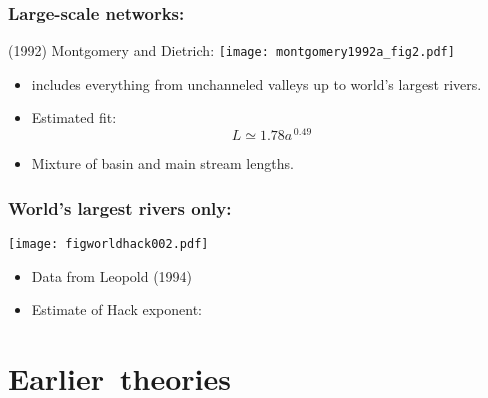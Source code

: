 \begin{frame}
  \frametitle{Large-scale networks:}

  \begin{block}{(1992) Montgomery and Dietrich\cite{montgomery1992a}:}
    \bigskip
    \texttt{[image: montgomery1992a\_fig2.pdf]}
    \begin{itemize}
    \item<1->
       includes everything from unchanneled valleys up
      to world's largest rivers.
    \item<1->
      Estimated fit: $$ L \simeq 1.78 a^{\, 0.49} $$
    \item<1->
      Mixture of basin and main stream lengths.
    \end{itemize}    
  \end{block}

\end{frame}

\begin{frame}
  \frametitle{World's largest rivers only:}

  \begin{block}{}
  \begin{center}
    \texttt{[image: figworldhack002.pdf]}
  \end{center}

  \begin{itemize}
  \item<1-> 
    Data from Leopold (1994)\cite{leopold1994a,dodds2000a}
  \item<1-> 
    Estimate of Hack exponent: 
  \end{itemize}
  \end{block}

\end{frame}

\section{Earlier\ theories}




